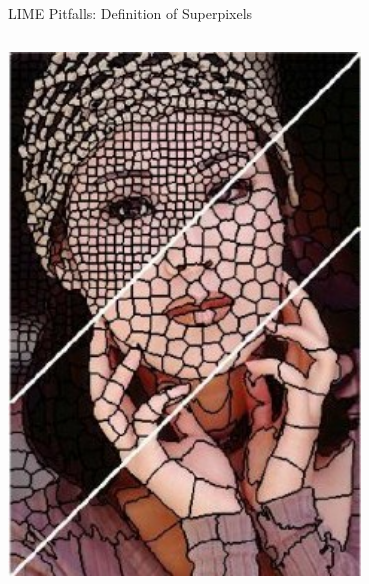 \documentclass[11pt,compress,t,notes=noshow, aspectratio=169, xcolor=table]{beamer}
\begin{document}
\begin{vbframe}{LIME Pitfalls: Definition of Superpixels }
\begin{columns}
\begin{column}{0.4\textwidth}
        \centering
        \includegraphics[width=0.7\textwidth]{figure/superpixel_woman}
        
    \end{column}
    
\end{columns}

\end{vbframe}


\endlecture
\end{document}
